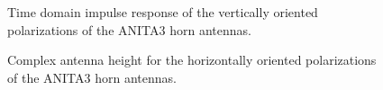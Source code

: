 \begin{figure}
\centering
{}
	\caption{Time domain impulse response of the vertically oriented polarizations of the ANITA3 horn antennas.}
\label{fig:antResponse_timeV}
\end{figure}

\begin{figure}
\centering
{}
	\caption{Complex antenna height for the horizontally oriented polarizations of the ANITA3 horn antennas.}
\label{fig:antResponse_fftH}
\end{figure}

